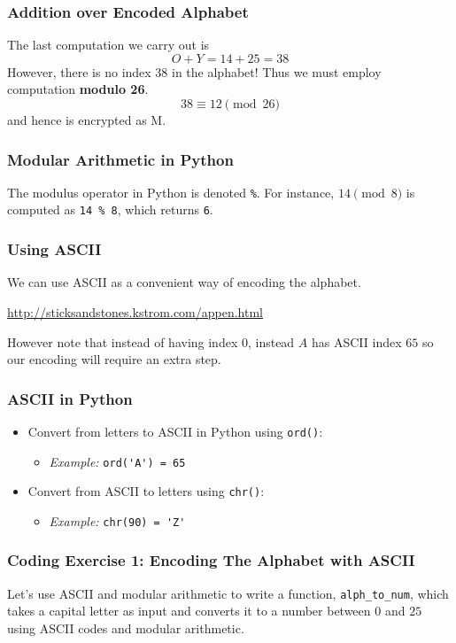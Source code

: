 \documentclass{beamer}
\newcommand{\<}{\langle}
\renewcommand{\>}{\rangle}
\begin{document}
\begin{frame}[fragile]
\frametitle{Addition over Encoded Alphabet}

The last computation we carry out is
\[
O + Y = 14 + 25 = 38
\]
However, there is no index 38 in the alphabet! Thus we must employ computation \textbf{modulo 26}.
\[
38 \equiv 12 \pmod{26}
\]
and hence is encrypted as M.
\end{frame}

\begin{frame}[fragile]
\frametitle{Modular Arithmetic in Python}

The modulus operator in Python is denoted \verb|%|. For instance, $14\pmod 8$ is computed as \verb|14 % 8|, which returns \verb|6|.
\end{frame}


\begin{frame}
\frametitle{Using ASCII}

We can use ASCII as a convenient way of encoding the alphabet. \newline

\url{http://sticksandstones.kstrom.com/appen.html} \newline

However note that instead of having index $0$, instead $A$ has ASCII index $65$ so our encoding will require an extra step. 
\end{frame}

\begin{frame}[fragile]
\frametitle{ASCII in Python}
\begin{itemize}
\item Convert from letters to ASCII in Python using \verb|ord()|:
	\begin{itemize}
	\item \emph{Example:} \verb|ord('A') = 65|
	\end{itemize}
\item Convert from ASCII to letters using \verb|chr()|:
	\begin{itemize}
	\item \emph{Example:} \verb|chr(90) = 'Z'|
	\end{itemize}
\end{itemize}
\end{frame}

\begin{frame}[fragile]
\frametitle{Coding Exercise 1: Encoding The Alphabet with ASCII}

Let's use ASCII and modular arithmetic to write a function, \verb|alph_to_num|, which takes a capital letter as input and converts it to a number between $0$ and $25$ using ASCII codes and modular arithmetic. 
\end{frame}
\end{document}
